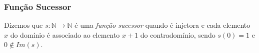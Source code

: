 \subsubsection*{Função Sucessor}
Dizemos que $s : \mathbb{N} \longrightarrow \mathbb{N}$ é uma \textit{função sucessor} quando é injetora e cada elemento $x$ do domínio é associado ao elemento $x + 1$ do contradomínio, sendo $s(0) = 1$ e $0 \notin Im(s)$.

